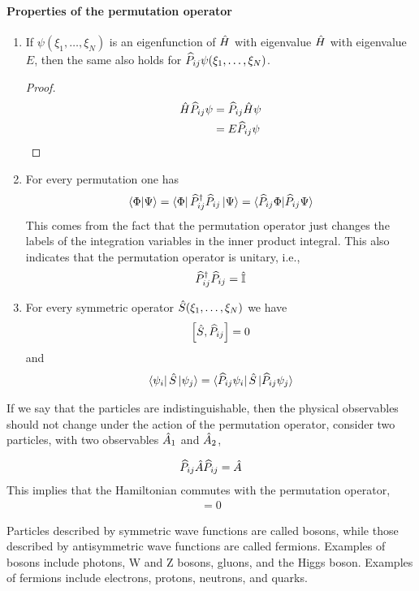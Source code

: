 \paragraph{Properties of the permutation operator}
\begin{enumerate}
    \item If $\psi(\xi_1,\dots , \xi_N)$ is an eigenfunction of $\hat{H}$ with eigenvalue $\hat{H}$ with eigenvalue $E$, then the same also holds for $\widehat{P}_{ij} \psi(\xi_1,\dots,\xi_N)$.
    \begin{proof}
        \begin{align*}
            \hat{H} \widehat{P}_{ij} \psi &= \widehat{P}_{ij} \hat{H} \psi \\
            &= E \widehat{P}_{ij} \psi
        \end{align*}
    \end{proof}
    \item For every permutation one has 
    \begin{align}
        \braket{\Phi|\Psi} = \bra{\Phi} \widehat{P}_{ij}^\dagger \widehat{P}_{ij} \ket{\Psi} = \braket{\widehat{P}_{ij} \Phi | \widehat{P}_{ij} \Psi}
    \end{align}
    This comes from the fact that the permutation operator just changes the labels of the integration variables in the inner product integral. This also indicates that the permutation operator is unitary, i.e.,
    \begin{align}
        \widehat{P}_{ij}^\dagger \widehat{P}_{ij} = \hat{\mathbb{I}}
    \end{align}
    \item For every symmetric operator $\hat{S}(\xi_1,\dots,\xi_N)$ we have 
    \begin{align}
        \left[ \hat{S} , \widehat{P}_{ij} \right] = 0
    \end{align}
    and 
    \begin{align}
        \bra{\psi_i} \hat{S} \ket{\psi_j} = \bra{\widehat{P}_{ij} \psi_i} \hat{S} \ket{\widehat{P}_{ij} \psi_j}
    \end{align}
\end{enumerate}

If we say that the particles are indistinguishable, then the physical observables should not change under the action of the permutation operator, consider two particles, with two observables $\hat{A}_1$ and $\hat{A}_2$, 

\begin{align}
    \widehat{P}_{ij} \hat{A} \widehat{P}_{ij} = \hat{A}
\end{align}
This implies that the Hamiltonian commutes with the permutation operator,
\begin{align}
    [\oH, \oP_{ij}] = 0
\end{align}

Particles described by symmetric wave functions are called bosons, while those described by antisymmetric wave functions are called fermions. Examples of bosons include photons, W and Z bosons, gluons, and the Higgs boson. Examples of fermions include electrons, protons, neutrons, and quarks.















